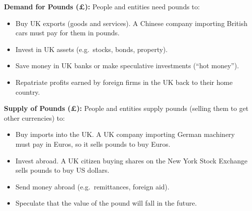 \documentclass[11pt, a4paper, twoside]{book}
\begin{document}
\textbf{Demand for Pounds (£):} People and entities need pounds to:
\begin{itemize}
  \item Buy UK exports (goods and services). A Chinese company importing British cars must pay for them in pounds.
  \item Invest in UK assets (e.g.\ stocks, bonds, property).
  \item Save money in UK banks or make speculative investments (``hot money'').
  \item Repatriate profits earned by foreign firms in the UK back to their home country.
\end{itemize}

\textbf{Supply of Pounds (£):} People and entities supply pounds (selling them to get other currencies) to:
\begin{itemize}
  \item Buy imports into the UK. A UK company importing German machinery must pay in Euros, so it sells pounds to buy Euros.
  \item Invest abroad. A UK citizen buying shares on the New York Stock Exchange sells pounds to buy US dollars.
  \item Send money abroad (e.g.\ remittances, foreign aid).
  \item Speculate that the value of the pound will fall in the future.
\end{itemize}
\end{document}
